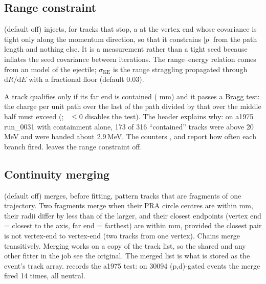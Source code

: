 \subsection{Range constraint}
\label{sec:gf-range}

 (default off) injects, for tracks that stop, a
 at the vertex end whose covariance is tight only along the momentum direction, so that
it constrains $|p|$ from the path length and nothing else. It is a measurement rather than a tight seed because
 inflates the seed covariance between iterations. The range--energy relation comes from an
 model of the ejectile; $\sigma_\mathrm{KE}$ is the range straggling propagated through
$\mathrm{d}R/\mathrm{d}E$ with a fractional floor  (default 0.03).

A track qualifies only if its far end is contained ( mm) and it passes a Bragg test: the charge per unit path over the last  of the path
divided by that over the middle half must exceed 
(; ~$\le0$ disables the test).
The header explains why: on a1975 run\_0031 with containment alone, 173 of 316 ``contained'' tracks were above 20\,MeV
and were handed about 2.9\,MeV. The counters ,  and
 report how often each branch fired.  leaves the range constraint
off.

\subsection{Continuity merging}
\label{sec:gf-merge}

 (default off) merges, before fitting, pattern
tracks that are fragments of one trajectory. Two fragments merge when their PRA circle centres are within
 mm, their radii differ by less than  of the larger, and their closest endpoints (vertex
end = closest to the axis, far end = farthest) are within  mm, provided the closest pair is not
vertex-end to vertex-end (two tracks from one vertex). Chains merge transitively. Merging works on a copy of the track
list, so the shared  and any other fitter in the job see the original. The merged list is what is
stored as the event's track array.  records the a1975 test: on 30094 (p,d)-gated events the
merge fired 14 times, all neutral.

